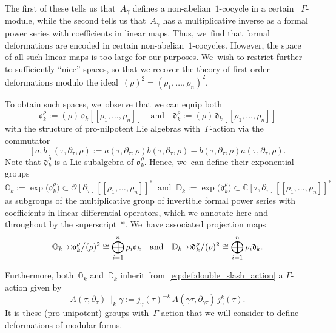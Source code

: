 \documentclass[10pt,a4paper]{article}
\numberwithin{equation}{section}
\newcommand{\onto}{\mathchoice{\to\hspace*{-5mm}\to}{\mathrel{\hbox{$\to\hspace*{-2.85mm}\to$}}}{\to\hspace*{-3mm}\to}{\to\hspace*{-3mm}\to}}
\theoremstyle{plain}
\theoremstyle{definition}
\newcommand{\tx}{\text}
\newcommand{\nbd}{\nobreakdash-\hspace{0pt}}
\newcommand{\bbC}{\ensuremath{\mathbb{C}}}
\newcommand{\bbD}{\ensuremath{\mathbb{D}}}
\newcommand{\bbO}{\ensuremath{\mathbb{O}}}
\newcommand{\cO}{\ensuremath{\mathcal{O}}}
\newcommand{\frakd}{\ensuremath{\mathfrak{d}}}
\newcommand{\frako}{\ensuremath{\mathfrak{o}}}
\newcommand{\defeq}{:=}
\newcommand{\llbrkt}{[\![}
\newcommand{\rrbrkt}{]\!]}
\let\Ga\Gamma
\let\ga\gamma
\begin{document}
The first of these tells us that~$A_\ga$ defines a non-abelian~$1$-cocycle in a certain ~$\Ga$\nbd{}module, while the second tells us that~$A_\ga$ has a multiplicative inverse as a formal power series with coefficients in linear maps. Thus, we~find that formal deformations are encoded in certain non-abelian~$1$-cocycles. However, the space of all such linear maps is too large for our purposes. We~wish to restrict further to sufficiently ``nice'' spaces, so that we recover the theory of first order deformations modulo the ideal~$(\rho)^2 = (\rho_1,\ldots,\rho_n)^2$.

To obtain such spaces, we~observe that we can equip both
\begin{equation}
\label{defeq:pronil}
\frako_k^\rho \defeq (\rho)\, \frako_k\llbrkt \rho_1,\ldots,\rho_n\rrbrkt
\quad\tx{and}\quad
\frakd_k^\rho \defeq (\rho)\, \frakd_k\llbrkt \rho_1,\ldots,\rho_n\rrbrkt
\end{equation}
with the structure of pro-nilpotent Lie algebras with~$\Ga$\nbd{}action via the commutator
\[
[a,b](\tau,\partial_\tau,\rho) := a(\tau,\partial_\tau,\rho)b(\tau,\partial_\tau,\rho)- b(\tau,\partial_\tau,\rho)a(\tau,\partial_\tau,\rho).\]
Note that $\frakd_k^\rho$ is a Lie subalgebra of $\frako_k^\rho$. Hence, we~can define their exponential groups
\begin{equation}
\label{defeq:groups_od}
\bbO_k
\!\defeq\!
\exp\bigl(\frako_k^\rho\bigr)
\!\subset\!
\cO[\partial_\tau]\llbrkt \rho_1,\ldots,\rho_n\rrbrkt^\ast
\;\;\tx{and}\;\;
\bbD_k
\!\defeq\!
\exp\bigl(\frakd_k^\rho\bigr)
\!\subset\!
\bbC[\tau,\partial_\tau]\llbrkt \rho_1,\ldots,\rho_n\rrbrkt^\ast
\end{equation}
as subgroups of the multiplicative group of invertible formal power series with coefficients in linear differential operators, which we annotate here and throughout by the superscript~$\ast$. We~have associated projection maps
\begin{equation}
\label{eq:projection_group_od_to_germ}
\bbO_k
\onto
\frako_k^\rho \big\slash (\rho)^2
\cong
\bigoplus_{i = 1}^n \rho_i \frako_k
\quad\tx{and}\quad
\bbD_k
\onto
\frakd_k^\rho \big\slash (\rho)^2
\cong
\bigoplus_{i = 1}^n \rho_i \frakd_k
\tx{.}
\end{equation}

Furthermore, both~$\bbO_k$ and~$\bbD_k$ inherit from~\eqref{eq:def:double_slash_action} a $\Ga$\nbd{}action given by
\begin{equation*}
A(\tau,\partial_\tau)\big\|_k \ga
\defeq
j_\ga(\tau)^{-k}\, A(\ga\tau,\partial_{\ga\tau})\, j_\ga^k(\tau)
\tx{.}
\end{equation*}
It is these (pro-unipotent) groups with~$\Ga$\nbd{}action that we will consider to define deformations of modular forms.
\end{document}
